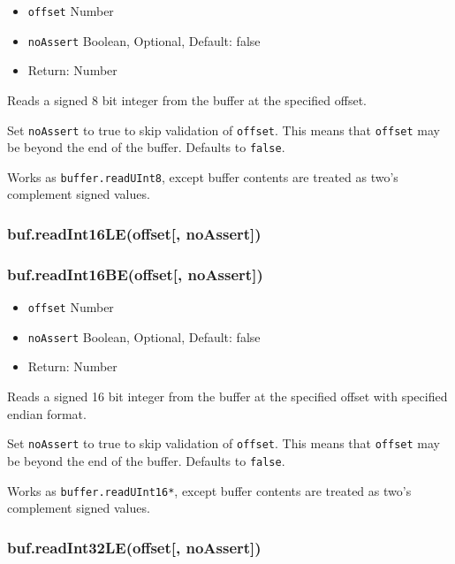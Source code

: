 \begin{itemize}
\itemsep1pt\parskip0pt
\item
  \texttt{offset} Number
\item
  \texttt{noAssert} Boolean, Optional, Default: false
\item
  Return: Number
\end{itemize}

Reads a signed 8 bit integer from the buffer at the specified offset.

Set \texttt{noAssert} to true to skip validation of \texttt{offset}.
This means that \texttt{offset} may be beyond the end of the buffer.
Defaults to \texttt{false}.

Works as \texttt{buffer.readUInt8}, except buffer contents are treated
as two's complement signed values.

\subsubsection{buf.readInt16LE(offset{[},
noAssert{]})}\label{buf.readint16leoffset-noassert}

\subsubsection{buf.readInt16BE(offset{[},
noAssert{]})}\label{buf.readint16beoffset-noassert}

\begin{itemize}
\itemsep1pt\parskip0pt
\item
  \texttt{offset} Number
\item
  \texttt{noAssert} Boolean, Optional, Default: false
\item
  Return: Number
\end{itemize}

Reads a signed 16 bit integer from the buffer at the specified offset
with specified endian format.

Set \texttt{noAssert} to true to skip validation of \texttt{offset}.
This means that \texttt{offset} may be beyond the end of the buffer.
Defaults to \texttt{false}.

Works as \texttt{buffer.readUInt16*}, except buffer contents are treated
as two's complement signed values.

\subsubsection{buf.readInt32LE(offset{[},
noAssert{]})}\label{buf.readint32leoffset-noassert}

